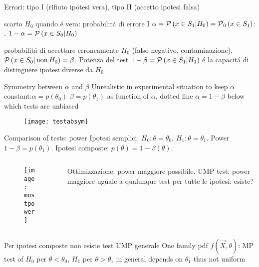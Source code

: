 \begin{frame}{Errori: tipo I (rifiuto ipotesi vera), tipo II (accetto ipotesi falsa)}
\begin{block}{ }
	scarto $H_0$ quando \'e vera: probabilit\'a di errore I $\alpha=\operatorname{\mathcal{P}}{(x\in S_1|H_0)}=\operatorname{\mathcal{P}}_0{(x\in S_1)}$: .  $1-\alpha=\operatorname{\mathcal{P}}{(x\in S_0|H_0)}$
\end{block}
\begin{block}{}
	probabilit\'a di accettare erroneamente $H_0$ (falso negativo, contaminazione), $\operatorname{\mathcal{P}}{(x\in S_0|\operatorname{non}{H_0})}=\beta$. Potenza del test $1-\beta=\operatorname{\mathcal{P}}{(x\in S_1|H_1)}$ \'e la capacit\'a di distinguere ipotesi diverse da $H_0$ 
\end{block}
\end{frame}

\begin{frame}{Symmetry between $\alpha$ and $\beta$}
Unrealistic in experimental situation to keep $\alpha$ constant:$\alpha=p(\theta_0)$ $\beta=p(\theta_1)$ as function of $\alpha$, dotted line $\alpha=1-\beta$ below which tests are unbiased
\begin{figure}[!ht]\texttt{[image: testabsym]}\label{fig:testabsym}\end{figure}
\end{frame}

\begin{frame}{Comparison of tests: power}
Ipotesi semplici: $H_0: \theta=\theta_0$, $H_1: \theta=\theta_1$. Power $1-\beta=p(\theta_1)$.
Ipotesi composte: $p(\theta)=1-\beta(\theta)$.
\begin{columns}[T]
\begin{column}{0.4\textwidth}
\begin{figure}[!ht]\texttt{[image: mostpower]}\label{fig:mostpower}
\end{figure}
\end{column}
\begin{column}{0.6\textwidth}

\begin{block}{Ottimizzazione: power maggiore possibile.}
	UMP test: power maggiore uguale a qualunque test per tutte le ipotesi: esiste?
\end{block}
\end{column}
\end{columns}
\begin{block}{Per ipotesi composte non esiste test UMP generale}
	One family pdf $f(\vec{X},\theta)$: MP test of $H_0$ per $\theta<\theta_0$, $H_1$ per $\theta>\theta_1$ in general depends on $\theta_1$ thus not uniform
\end{block}
\end{frame}

